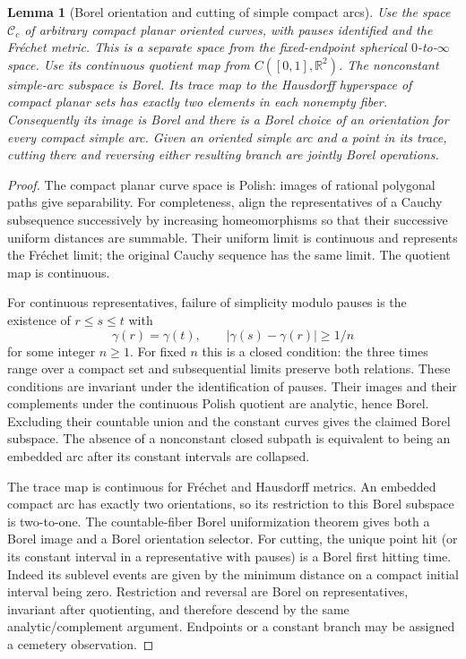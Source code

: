\documentclass[11pt]{article}
\newtheorem{lemma}[theorem]{Lemma}
\theoremstyle{definition}\newtheorem{definition}[theorem]{Definition}
\theoremstyle{remark}\newtheorem{remark}[theorem]{Remark}
\begin{document}
\begin{lemma}[Borel orientation and cutting of simple compact arcs]
\label{lem:borel-simple-arc}
Use the space $\mathcal C_c$ of arbitrary compact planar oriented
curves, with pauses identified and the Fr\'echet metric. This is a
separate space from the fixed-endpoint spherical $0$-to-$\infty$ space.
Use its continuous quotient map from $C([0,1],\mathbb R^2)$.
The nonconstant simple-arc subspace is Borel. Its trace map to the
Hausdorff hyperspace of compact planar sets has exactly two elements
in each nonempty fiber. Consequently its image is Borel and there is
a Borel choice of an orientation for every compact simple arc. Given
an oriented simple arc and a point in its trace, cutting there and
reversing either resulting branch are jointly Borel operations.
\end{lemma}
\begin{proof}
The compact planar curve space is Polish: images of rational
polygonal paths give separability. For completeness, align the
representatives of a Cauchy subsequence successively by increasing
homeomorphisms so that their successive uniform distances are
summable. Their uniform limit is continuous and represents the
Fr\'echet limit; the original Cauchy sequence has the same limit.
The quotient map is continuous.

For continuous representatives, failure of simplicity modulo pauses is
the existence of $r\le s\le t$ with
\[
 \gamma(r)=\gamma(t),\qquad
             |\gamma(s)-\gamma(r)|\ge1/n
 \tag{UA1}
\]
for some integer $n\ge1$. For fixed $n$ this is a closed condition:
the three times range over a compact set and subsequential limits
preserve both relations. These conditions are invariant under the
identification of pauses. Their images and their complements under
the continuous Polish quotient are analytic, hence Borel. Excluding
their countable union and the constant curves gives the claimed
Borel subspace. The absence of a nonconstant closed subpath is
equivalent to being an embedded arc after its constant intervals are
collapsed.

The trace map is continuous for Fr\'echet and Hausdorff metrics.
An embedded compact arc has exactly two orientations, so its
restriction to this Borel subspace is two-to-one. The countable-fiber
Borel uniformization theorem gives both a Borel image and a Borel
orientation selector. For cutting, the unique point hit (or its
constant interval in a representative with pauses) is a Borel first
hitting time. Indeed its sublevel events are given by the minimum
distance on a compact initial interval being zero. Restriction and
reversal are Borel on representatives, invariant after quotienting,
and therefore descend by the same analytic/complement argument.
Endpoints or a constant branch may be assigned a cemetery observation.
\end{proof}
\end{document}
